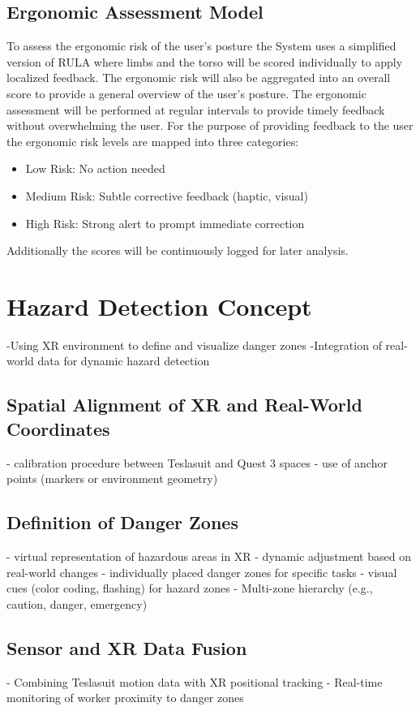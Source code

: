 \subsection{Ergonomic Assessment Model}
To assess the ergonomic risk of the user's posture the System uses a simplified version of RULA where limbs and the torso will be scored individually to apply localized feedback. The ergonomic risk will also be aggregated into an overall score to provide a general overview of the user's posture. The ergonomic assessment will be performed at regular intervals to provide timely feedback without overwhelming the user.
For the purpose of providing feedback to the user the ergonomic risk levels are mapped into three categories:
\begin{itemize}
    \item Low Risk: No action needed
    \item Medium Risk: Subtle corrective feedback (haptic, visual)
    \item High Risk: Strong alert to prompt immediate correction
\end{itemize}
Additionally the scores will be continuously logged for later analysis.

\section{Hazard Detection Concept}
-Using XR environment to define and visualize danger zones
-Integration of real-world data for dynamic hazard detection
\subsection{Spatial Alignment of XR and Real-World Coordinates}
- calibration procedure between Teslasuit and Quest 3 spaces
- use of anchor points (markers or environment geometry)

\subsection{Definition of Danger Zones}
- virtual representation of hazardous areas in XR
- dynamic adjustment based on real-world changes
- individually placed danger zones for specific tasks
- visual cues (color coding, flashing) for hazard zones
- Multi-zone hierarchy (e.g., caution, danger, emergency)

\subsection{Sensor and XR Data Fusion}
- Combining Teslasuit motion data with XR positional tracking
- Real-time monitoring of worker proximity to danger zones


